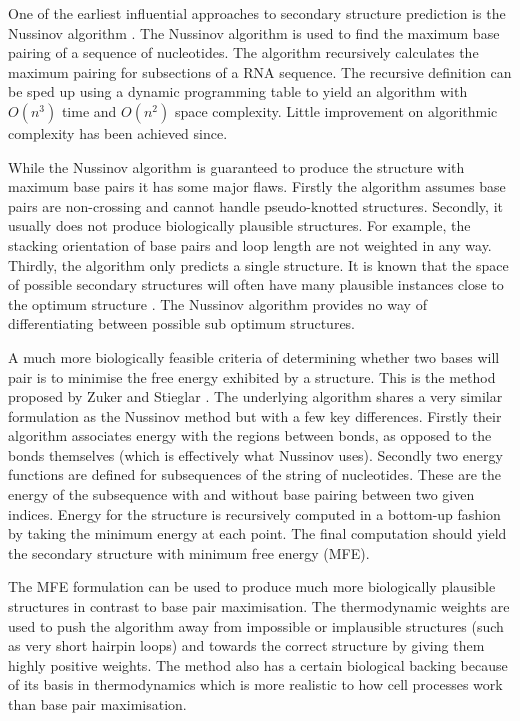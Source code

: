 \documentclass[journal]{IEEEtran}
\begin{document}
One of the earliest influential approaches to secondary structure prediction is the Nussinov algorithm \cite{nussinov1980fast}. The Nussinov algorithm is used to find the maximum base pairing of a sequence of nucleotides. The algorithm recursively calculates the maximum pairing for subsections of a RNA sequence. The recursive definition can be sped up using a dynamic programming table to yield an algorithm with $O(n^3)$ time and $O(n^2)$ space complexity. Little improvement on algorithmic complexity has been achieved since. 

While the Nussinov algorithm is guaranteed to produce the structure with maximum base pairs it has some major flaws. Firstly the algorithm assumes base pairs are non-crossing and cannot handle pseudo-knotted structures. Secondly, it usually does not produce biologically plausible structures. For example, the stacking orientation of base pairs and loop length are not weighted in any way. Thirdly, the algorithm only predicts a single structure. It is known that the space of possible secondary structures will often have many plausible instances close to the optimum structure \cite{mccaskill1990equilibrium}. The Nussinov algorithm provides no way of differentiating between possible sub optimum structures. 

A much more biologically feasible criteria of determining whether two bases will pair is to minimise the free energy exhibited by a structure. This is the method proposed by Zuker and Stieglar \cite{zuker1981optimal}. The underlying algorithm shares a very similar formulation as the Nussinov method but with a few key differences. Firstly their algorithm associates energy with the regions between bonds, as opposed to the bonds themselves (which is effectively what Nussinov uses). Secondly two energy functions are defined for subsequences of the string of nucleotides. These are the energy of the subsequence with and without base pairing between two given indices. Energy for the structure is recursively computed in a bottom-up fashion by taking the minimum energy at each point. The final computation should yield the secondary structure with minimum free energy (MFE).

The MFE formulation can be used to produce much more biologically plausible structures in contrast to base pair maximisation. The thermodynamic weights are used to push the algorithm away from impossible or implausible structures (such as very short hairpin loops) and towards the correct structure by giving them highly positive weights. The method also has a certain biological backing because of its basis in thermodynamics which is more realistic to how cell processes work than base pair maximisation. 
\end{document}

